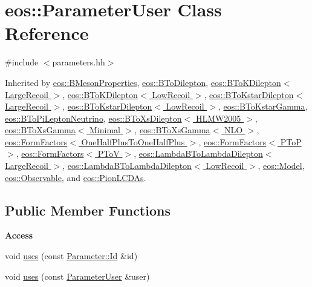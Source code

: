 \hypertarget{classeos_1_1ParameterUser}{
\section{eos::ParameterUser Class Reference}
\label{classeos_1_1ParameterUser}
}


{\ttfamily \#include $<$parameters.hh$>$}

Inherited by \hyperlink{classeos_1_1BMesonProperties}{eos::BMesonProperties}, \hyperlink{classeos_1_1BToDilepton}{eos::BToDilepton}, \hyperlink{classeos_1_1BToKDilepton_3_01LargeRecoil_01_4}{eos::BToKDilepton$<$ LargeRecoil $>$}, \hyperlink{classeos_1_1BToKDilepton_3_01LowRecoil_01_4}{eos::BToKDilepton$<$ LowRecoil $>$}, \hyperlink{classeos_1_1BToKstarDilepton_3_01LargeRecoil_01_4}{eos::BToKstarDilepton$<$ LargeRecoil $>$}, \hyperlink{classeos_1_1BToKstarDilepton_3_01LowRecoil_01_4}{eos::BToKstarDilepton$<$ LowRecoil $>$}, \hyperlink{classeos_1_1BToKstarGamma}{eos::BToKstarGamma}, \hyperlink{classeos_1_1BToPiLeptonNeutrino}{eos::BToPiLeptonNeutrino}, \hyperlink{classeos_1_1BToXsDilepton_3_01HLMW2005_01_4}{eos::BToXsDilepton$<$ HLMW2005 $>$}, \hyperlink{classeos_1_1BToXsGamma_3_01Minimal_01_4}{eos::BToXsGamma$<$ Minimal $>$}, \hyperlink{classeos_1_1BToXsGamma_3_01NLO_01_4}{eos::BToXsGamma$<$ NLO $>$}, \hyperlink{classeos_1_1FormFactors_3_01OneHalfPlusToOneHalfPlus_01_4}{eos::FormFactors$<$ OneHalfPlusToOneHalfPlus $>$}, \hyperlink{classeos_1_1FormFactors_3_01PToP_01_4}{eos::FormFactors$<$ PToP $>$}, \hyperlink{classeos_1_1FormFactors_3_01PToV_01_4}{eos::FormFactors$<$ PToV $>$}, \hyperlink{classeos_1_1LambdaBToLambdaDilepton_3_01LargeRecoil_01_4}{eos::LambdaBToLambdaDilepton$<$ LargeRecoil $>$}, \hyperlink{classeos_1_1LambdaBToLambdaDilepton_3_01LowRecoil_01_4}{eos::LambdaBToLambdaDilepton$<$ LowRecoil $>$}, \hyperlink{classeos_1_1Model}{eos::Model}, \hyperlink{classeos_1_1Observable}{eos::Observable}, and \hyperlink{classeos_1_1PionLCDAs}{eos::PionLCDAs}.\subsection*{Public Member Functions}
\begin{Indent}{\bf Access}\par
{\em \label{_amgrpbf733d8a933c1601697f364223fc7ecb}
 }\begin{DoxyCompactItemize}
\item 
void \hyperlink{classeos_1_1ParameterUser_ad91a901e589653272482bded7e453c70}{uses} (const \hyperlink{classeos_1_1Parameter_a065f55e66b2128cc5f14339e676d833a}{Parameter::Id} \&id)
\item 
void \hyperlink{classeos_1_1ParameterUser_a7a37e779cf45ef1075fe7bf670688b72}{uses} (const \hyperlink{classeos_1_1ParameterUser}{ParameterUser} \&user)
\end{DoxyCompactItemize}
\end{Indent}
